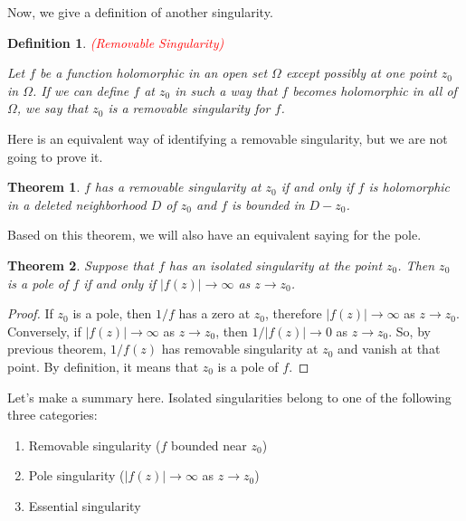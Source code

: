 \documentclass{article}
\newtheorem{definition}{Definition}
\newtheorem{theorem}{Theorem}
\begin{document}
Now, we give a definition of another singularity. 

\begin{definition} \textcolor{red}{(Removable Singularity)}

Let $f$ be a function holomorphic in an open set $\Omega$ except possibly at one point $z_0$ in $\Omega$. If we can define $f$ at $z_0$ in such a way that $f$ becomes holomorphic in all of $\Omega$, we say that $z_0$ is a removable singularity for $f$.

\end{definition}

Here is an equivalent way of identifying a removable singularity, but we are not going to prove it. 

\begin{theorem}
$f$ has a removable singularity at $z_0$ if and only if $f$ is holomorphic in a deleted neighborhood $D$ of $z_0$ and $f$ is bounded in $D-z_0$.
\end{theorem}
Based on this theorem, we will also have an equivalent saying for the pole.

\begin{theorem}
Suppose that $f$ has an isolated singularity at the point $z_0$. Then $z_0$ is a pole of $f$ if and only if $|f(z)|\rightarrow\infty$ as $z\rightarrow z_0$.
\end{theorem}

\begin{proof}
If $z_0$ is a pole, then $1/f$ has a zero at $z_0$, therefore $|f(z)|\rightarrow\infty$ as $z\rightarrow z_0$. Conversely, if $|f(z)|\rightarrow\infty$ as $z\rightarrow z_0$, then $1/|f(z)|\rightarrow 0$ as $z\rightarrow z_0$. So, by previous theorem, $1/f(z)$ has removable singularity at $z_0$ and vanish at that point. By definition, it means that $z_0$ is a pole of $f$.
\end{proof}

Let's make a summary here. Isolated singularities belong to one of the following three categories:

\begin{enumerate}
\item
Removable singularity ($f$ bounded near $z_0$)

\item
Pole singularity ($|f(z)|\rightarrow\infty$ as $z\rightarrow z_0$)

\item
Essential singularity
\end{enumerate}
\end{document}
